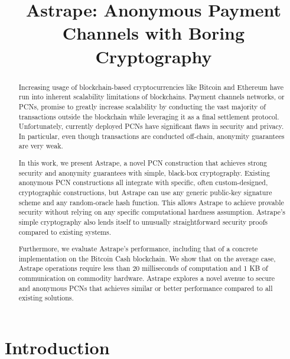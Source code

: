 \documentclass[USenglish,oneside,twocolumn]{article}
\begin{document}
\title{Astrape: Anonymous Payment Channels with Boring Cryptography}
\maketitle

\begin{abstract}
    Increasing usage of blockchain-based cryptocurrencies like Bitcoin and Ethereum have run into inherent scalability limitations of blockchains. Payment channels networks, or PCNs, promise to greatly increase scalability by conducting the vast majority of transactions outside the blockchain while leveraging it as a final settlement protocol. Unfortunately, currently deployed PCNs have significant flaws in security and privacy. In particular, even though transactions are conducted off-chain, anonymity guarantees are very weak.

    In this work, we present Astrape, a novel PCN construction that achieves strong security and anonymity guarantees with simple, black-box cryptography. Existing anonymous PCN constructions all integrate with specific, often custom-designed, cryptographic constructions, but Astrape can use any generic public-key signature scheme and any random-oracle hash function. This allows Astrape to achieve provable security without relying on any specific computational hardness assumption. Astrape's simple cryptography also lends itself to unusually straightforward security proofs compared to existing systems.

    Furthermore, we evaluate Astrape's performance, including that of a concrete implementation on the Bitcoin Cash blockchain. We show that on the average case, Astrape operations require less than 20 milliseconds of computation and 1 KB of communication on commodity hardware. Astrape explores a novel avenue to secure and anonymous PCNs that achieves similar or better performance compared to all existing solutions.
\end{abstract}

\section{Introduction}
\end{document}
